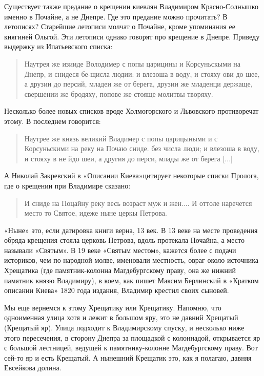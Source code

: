 Существует также предание о крещении киевлян Владимиром Красно-Солнышко именно в Почайне, а не Днепре. Где это предание можно прочитать? В летописях? Старейшие летописи молчат о Почайне, кроме упоминания ее княгиней Ольгой. Эти летописи однако говорят про крещение в Днепре. Приведу выдержку из Ипатьевского списка:

\begin{quotation}
Наутрея же изииде Володимер с попы царицины и Корсуньскыми на Днепр, и снидеся бе-щисла людии: и влезоша в воду, и стояху ови до шее, а друзии до персий, младеи же от берега, друзии же младенци держаще, свершении же бродяху, попове же стояще молитвы творяху.
\end{quotation}

Несколько более новых списков вроде Холмогорского и Львовского противоречат этому. В последнем говорится:

\begin{quotation}
Наутрее же князь великий Владимер с попы царицыными и с Корсуньскими на реку на Почаю сниде. без числа люди; и влезоша в воду, и стояху в не йдо шеи, а другия до перси, млады же от берега [...]
\end{quotation}

А Николай Закревский в «Описании Киева»\cite{zakr01}цити\-рует некоторые списки Пролога, где о крещении при Владимире сказано:

\begin{quotation}
И сниде на Поцайну реку весь возраст муж и жен.... И оттоле наречется место то Святое, идеже ныне церкы Петрова.
\end{quotation}

«Ныне» это, если датировка книги верна, 13 век. В 13 веке на месте проведения обряда крещения стояла церковь Петрова, вдоль протекала Почайна, а место называли «Святым». В 19 веке «Святым местом», кажется более с подачи историков, чем по народной молве, именовали местность, овраг около источника Хрещатика (где памятник-колонна Магдебургскому праву, она же нижний памятник князю Владимиру), в коем, как пишет Максим Берлинский в «Кратком описании Киева» 1820 года издания\cite{berl01}, Владимир крестил своих сыновей.

Мы еще вернемся к этому Хрещатику или Крещатику. Напомню, что одноименная улица хотя и лежит в большом яру, это не давний Хрещатый (Крещатый яр). Улица подходит к Владимирскому спуску, и несколько ниже этого пересечения, в сторону Днепра за площадкой с колоннадой, открывается яр с большой лестницей, ведущей к памятнику-колонне Магдебургскому праву. Вот сей-то яр и есть Крещатый. А нынешний Крещатик это, как я полагаю, давняя Евсейкова долина.

